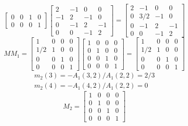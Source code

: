\begin{itemize}
\[\begin{bmatrix}
    		 0 & 0 & 1 & 0 \\
    		 0 & 0 & 0 & 1  
  			\end{bmatrix}
  			\begin{bmatrix}
    		2 & -1 & 0 & 0 \\
    		-1 & 2 & -1 & 0 \\
    		0 & -1 & 2 & -1 \\
    		0 & 0 & -1 & 2  
  			\end{bmatrix}
  			=
  			\begin{bmatrix}
    		2 & -1 & 0 & 0 \\
    		0 & 3/2 & -1 & 0 \\
    		0 & -1 & 2 & -1 \\
    		0 & 0 & -1 & 2  
  			\end{bmatrix}
  			\]
  			\[ MM_{1} = 
  			\begin{bmatrix}
   			 1 & 0 & 0 & 0 \\ 
    		 1/2 & 1 & 0 & 0 \\
    		 0 & 0 & 1 & 0 \\
    		 0 & 0 & 0 & 1  
  			\end{bmatrix}
  			\begin{bmatrix}
   			 1 & 0 & 0 & 0 \\ 
    		 0 & 1 & 0 & 0 \\
    		 0 & 0 & 1 & 0 \\
    		 0 & 0 & 0 & 1  
  			\end{bmatrix}
  			= 
  			\begin{bmatrix}
   			 1 & 0 & 0 & 0 \\ 
    		 1/2 & 1 & 0 & 0 \\
    		 0 & 0 & 1 & 0 \\
    		 0 & 0 & 0 & 1  
  			\end{bmatrix}
  			\]
  			\begin {equation*} \begin {split}  	
				m_{2}(3) = -A_{1}(3,2)/A_{1}(2,2) = 2/3 \\
				m_{2}(4) = -A_{1}(4,2)/A_{1}(2,2) = 0  
  			\end {split} \end {equation*}
  			\[ M_{2} = 
  			\begin{bmatrix}
   			 1 & 0 & 0 & 0 \\ 
    		 0 & 1 & 0 & 0 \\
    		 0 & 0 & 1 & 0 \\
    		 0 & 0 & 0 & 1  
  			\end{bmatrix}
\]
\end{itemize}
